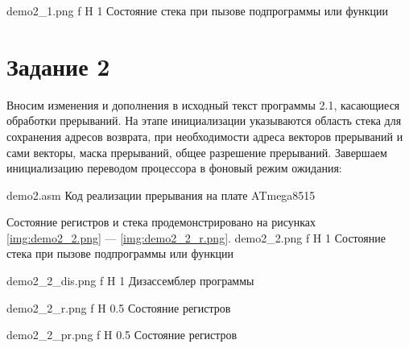 \documentclass{bmstu}
\begin{document}
    {demo2_1.png} %
    {f} %
    {H} %
    {1\textwidth} %
    {Состояние стека при пызове подпрограммы или функции} 



\section{Задание 2}
Вносим изменения  и дополнения в исходный текст программы 2.1, касающиеся обработки прерываний. На этапе инициализации указываются область стека для сохранения адресов возврата, при необходимости адреса векторов прерываний и сами векторы, маска прерываний, общее разрешение прерываний. Завершаем инициализацию переводом процессора в фоновый режим ожидания:

	{demo2.asm}
	{Код реализации прерывания на плате ATmega8515}

Состояние регистров и стека продемонстрировано на рисунках \ref{img:demo2_2.png} --- \ref{img:demo2_2_r.png}.
    {demo2_2.png} %
    {f} %
    {H} %
    {1\textwidth} %
    {Состояние стека при пызове подпрограммы или функции} 
    

    {demo2_2_dis.png} %
    {f} %
    {H} %
    {1\textwidth} %
    {Дизассемблер программы}     
    

    {demo2_2_r.png} %
    {f} %
    {H} %
    {0.5\textwidth} %
    {Состояние регистров} 


    {demo2_2_pr.png} %
    {f} %
    {H} %
    {0.5\textwidth} %
    {Состояние регистров} 
\end{document}
